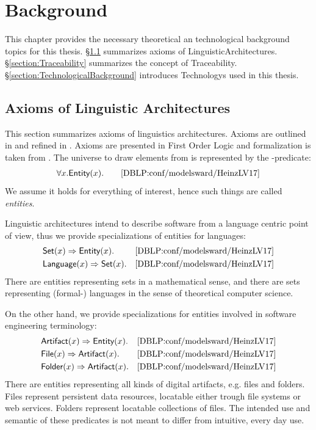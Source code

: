 \chapter{Background}
\label{chapter:Background}
This chapter provides the necessary theoretical an technological background topics for this thesis.
§\ref{section:AxiomsOfLinguisticArchitectures} summarizes axioms of \glspl{LinguisticArchitecture}.
§\ref{section:Traceability} summarizes the concept of \gls{Traceability}.
§\ref{section:TechnologicalBackground} introduces \glspl{Technology} used in this thesis.

\section{Axioms of Linguistic Architectures}
\label{section:AxiomsOfLinguisticArchitectures}
This section summarizes axioms of linguistics architectures.
Axioms are outlined in \cite{DBLP:conf/sle/Lammel16} and refined in \cite{DBLP:conf/modelsward/HeinzLV17}.
Axioms are presented in First Order Logic and formalization is taken from \cite{DBLP:conf/modelsward/HeinzLV17}.
The universe to draw elements from is represented by the \Entity-predicate:
\begin{align*}
\forall x.\textsf{Entity}(x).\qquad\text{\cite{DBLP:conf/modelsward/HeinzLV17}}
\end{align*}
We assume it holds for everything of interest, hence such things are called \textit{entities}.

Linguistic architectures intend to describe software from a language centric point of view, thus we provide specializations of entities for languages:
\begin{align*}
&\textsf{Set}(x) \Rightarrow \textsf{Entity}(x).
&\text{\cite{DBLP:conf/modelsward/HeinzLV17}}
\\
&\textsf{Language}(x) \Rightarrow \textsf{Set}(x).
&\text{\cite{DBLP:conf/modelsward/HeinzLV17}}
\end{align*}
There are entities representing sets in a mathematical sense, and there are sets representing (formal-) languages in the sense of theoretical computer science.

On the other hand, we provide specializations for entities involved in software engineering terminology:
\begin{align*}
&\textsf{Artifact}(x) \Rightarrow \textsf{Entity}(x).
&\text{\cite{DBLP:conf/modelsward/HeinzLV17}}
\\
&\textsf{File}(x) \Rightarrow \textsf{Artifact}(x).
&\text{\cite{DBLP:conf/modelsward/HeinzLV17}}
\\
&\textsf{Folder}(x) \Rightarrow \textsf{Artifact}(x).
&\text{\cite{DBLP:conf/modelsward/HeinzLV17}}
\end{align*}
There are entities representing all kinds of digital artifacts, e.g. files and folders.
Files represent persistent data resources, locatable either trough file systems or web services.
Folders represent locatable collections of files.
The intended use and semantic of these predicates is not meant to differ from intuitive, every day use.



